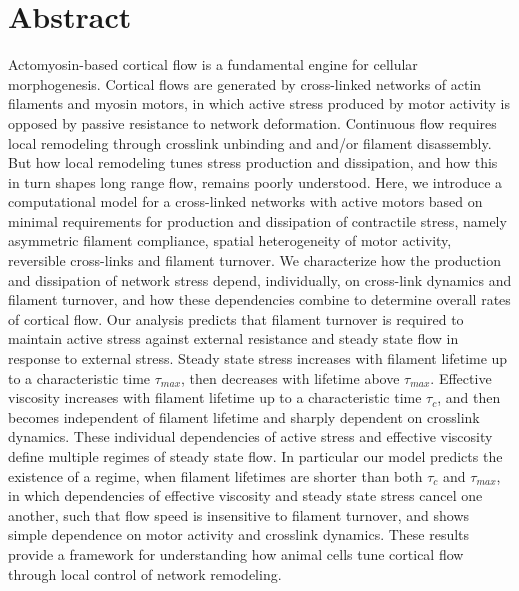 \documentclass[10pt,letterpaper]{article}
\begin{document}
\section*{Abstract}
Actomyosin-based cortical flow is a fundamental engine for cellular morphogenesis.  Cortical flows are generated by cross-linked networks of actin filaments and myosin motors, in which active stress produced by motor activity is opposed by passive resistance to network deformation.  Continuous flow requires local remodeling through crosslink unbinding and and/or filament disassembly. But how local remodeling tunes stress production and dissipation, and how this in turn shapes long range flow, remains poorly understood. Here, we introduce a computational model for a cross-linked networks with active motors based on minimal requirements for production and dissipation of contractile stress, namely asymmetric filament compliance, spatial heterogeneity of motor activity, reversible cross-links and filament turnover.  We characterize how the production and dissipation of network stress depend, individually, on cross-link dynamics and filament turnover, and how these dependencies combine to determine overall rates of cortical flow. Our analysis predicts that filament turnover is required to maintain active stress against external resistance and steady state flow in response to external stress. Steady state stress increases with filament lifetime up to a characteristic time $\tau_{max}$, then decreases with lifetime above $\tau_{max}$.   Effective viscosity increases with filament lifetime up to a characteristic time $\tau_c$, and then becomes independent of filament lifetime and sharply dependent on crosslink dynamics.  These individual dependencies of active stress and effective viscosity define multiple regimes of steady state flow.  In particular our model predicts the existence of a regime, when filament lifetimes are shorter than both $\tau_c$ and $\tau_{max}$, in which dependencies of effective viscosity and steady state stress cancel one another, such that flow speed is insensitive to filament turnover, and shows simple dependence on motor activity and crosslink dynamics.  These results provide a framework for understanding how animal cells tune cortical flow through local control of network remodeling.

\end{document}
